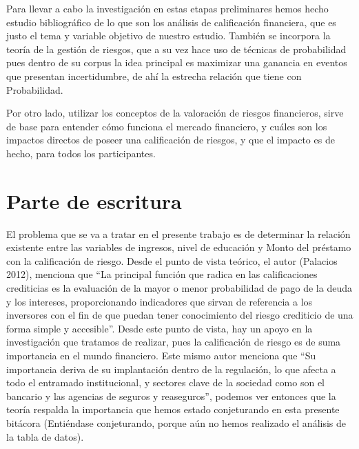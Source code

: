 \documentclass[
  letterpaper,
  DIV=11,
  numbers=noendperiod]{scrreprt}
\begin{document}
Para llevar a cabo la investigación en estas etapas preliminares hemos
hecho estudio bibliográfico de lo que son los análisis de calificación
financiera, que es justo el tema y variable objetivo de nuestro estudio.
También se incorpora la teoría de la gestión de riesgos, que a su vez
hace uso de técnicas de probabilidad pues dentro de su corpus la idea
principal es maximizar una ganancia en eventos que presentan
incertidumbre, de ahí la estrecha relación que tiene con Probabilidad.

Por otro lado, utilizar los conceptos de la valoración de riesgos
financieros, sirve de base para entender cómo funciona el mercado
financiero, y cuáles son los impactos directos de poseer una
calificación de riesgos, y que el impacto es de hecho, para todos los
participantes.

\section{Parte de escritura}\label{parte-de-escritura}

El problema que se va a tratar en el presente trabajo es de determinar
la relación existente entre las variables de ingresos, nivel de
educación y Monto del préstamo con la calificación de riesgo. Desde el
punto de vista teórico, el autor (Palacios 2012), menciona que ``La
principal función que radica en las calificaciones crediticias es la
evaluación de la mayor o menor probabilidad de pago de la deuda y los
intereses, proporcionando indicadores que sirvan de referencia a los
inversores con el fin de que puedan tener conocimiento del riesgo
crediticio de una forma simple y accesible''. Desde este punto de vista,
hay un apoyo en la investigación que tratamos de realizar, pues la
calificación de riesgo es de suma importancia en el mundo financiero.
Este mismo autor menciona que ``Su importancia deriva de su implantación
dentro de la regulación, lo que afecta a todo el entramado
institucional, y sectores clave de la sociedad como son el bancario y
las agencias de seguros y reaseguros'', podemos ver entonces que la
teoría respalda la importancia que hemos estado conjeturando en esta
presente bitácora (Entiéndase conjeturando, porque aún no hemos
realizado el análisis de la tabla de datos).
\end{document}
